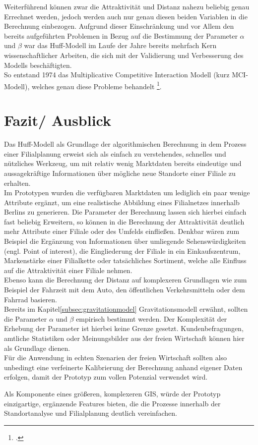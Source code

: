 Weiterführend können zwar die Attraktivität und Distanz nahezu beliebig genau Errechnet werden, jedoch werden auch nur genau diesen beiden Variablen in die Berechnung einbezogen.
Aufgrund dieser Einschränkung und vor Allem den bereits aufgeführten Problemen in Bezug auf die Bestimmung der Parameter $\alpha$ und $\beta$ war das Huff-Modell im Laufe der Jahre bereits mehrfach Kern wissenschaftlicher Arbeiten, die sich mit der Validierung und Verbesserung des Modells beschäftigten.\\
So entstand 1974 das Multiplicative Competitive Interaction Modell (kurz MCI-Modell), welches genau diese Probleme behandelt \footcite{nakanishi_parameter_1974}.  

\section{Fazit/ Ausblick}
Das Huff-Modell als Grundlage der algorithmischen Berechnung in dem Prozess einer Filialplanung erweist sich als einfach zu verstehendes, schnelles und nützliches Werkzeug, um mit relativ wenig Marktdaten bereits eindeutige und aussagekräftige Informationen über mögliche neue Standorte einer Filiale zu erhalten.\\
Im Prototypen wurden die verfügbaren Marktdaten um lediglich ein paar wenige Attribute ergänzt, um eine realistische Abbildung eines Filialnetzes innerhalb Berlins zu generieren. 
Die Parameter der Berechnung lassen sich hierbei einfach fast beliebig Erweitern, so können in die Berechnung der Attraktivität deutlich mehr Attribute einer Filiale oder des Umfelds einfließen.
Denkbar wären zum Beispiel die Ergänzung von Informationen über umliegende Sehenswürdigkeiten (engl. Point of interest), die Eingliederung der Filiale in ein Einkaufszentrum, Markenstärke einer Filialkette oder tatsächliches Sortiment, welche alle Einfluss auf die Attraktivität einer Filiale nehmen.\\
Ebenso kann die Berechnung der Distanz auf komplexeren Grundlagen wie zum Beispiel der Fahrzeit mit dem Auto, den öffentlichen Verkehrsmitteln oder dem Fahrrad basieren.\\
Bereits im Kapitel\ref{subsec:gravitationmodel} Gravitationsmodell erwähnt, sollten die Parameter $\alpha$ und $\beta$ empirisch bestimmt werden.
Der Komplexität der Erhebung der Parameter ist hierbei keine Grenze gesetzt. 
Kundenbefragungen, amtliche Statistiken oder Meinungsbilder aus der freien Wirtschaft können hier als Grundlage dienen.\\
Für die Anwendung in echten Szenarien der freien Wirtschaft sollten also unbedingt eine verfeinerte Kalibrierung der Berechnung anhand eigener Daten erfolgen, damit der Prototyp zum vollen Potenzial verwendet wird.

Als Komponente eines größeren, komplexeren GIS, würde der Prototyp einzigartige, ergänzende Features bieten, die die Prozesse innerhalb der Standortanalyse und Filialplanung deutlich vereinfachen.\\
